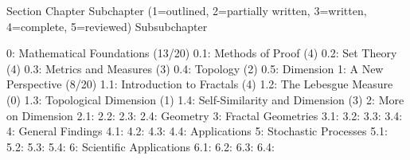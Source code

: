 Section
    Chapter
        Subchapter (1=outlined, 2=partially written, 3=written, 4=complete, 5=reviewed)
            Subsubchapter


    0: Mathematical Foundations                 (13/20)
        0.1: Methods of Proof               (4)
        0.2: Set Theory                     (4)
        0.3: Metrics and Measures           (3)
        0.4: Topology                       (2)
        0.5: 
Dimension
    1: A New Perspective                        (8/20)
        1.1: Introduction to Fractals       (4)
        1.2: The Lebesgue Measure           (0)
        1.3: Topological Dimension          (1)
        1.4: Self-Similarity and Dimension  (3)
    2: More on Dimension
        2.1: 
        2.2: 
        2.3:
        2.4:
Geometry
    3: Fractal Geometries
        3.1: 
        3.2: 
        3.3: 
        3.4: 
    4: General Findings
        4.1: 
        4.2: 
        4.3: 
        4.4: 
Applications
    5: Stochastic Processes
        5.1: 
        5.2: 
        5.3: 
        5.4: 
    6: Scientific Applications
        6.1: 
        6.2: 
        6.3: 
        6.4: 